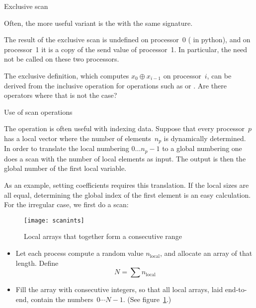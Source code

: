  {Exclusive scan}
\label{sec:mpi-exscan}

Often, the more useful variant is the 
%
%
with the same signature. 

The result of the exclusive scan is undefined on processor~0
( in python),
and on processor~1 it is a copy of the send value of processor~1.
In particular, the  need not be called on these two 
processors.

\begin{exercise}
  The exclusive definition, which computes $x_0\oplus x_{i-1}$ on
  processor~$i$, can be derived from the inclusive operation
  for operations such as  or
  .  Are there operators where that is not the
  case?
\end{exercise}

 {Use of scan operations}

The  operation is often useful with indexing data. Suppose that
every processor~$p$ has a local vector where the number of elements~$n_p$ is dynamically 
determined. In order to translate the local numbering $0\ldots n_p-1$ to a global numbering
one does a scan with the number of local elements as input. The output is then the global 
number of the first local variable.

As an example, setting  coefficients requires this translation.
If the local sizes are all equal, determining the global index of the
first element is an easy calculation.
For the irregular case, we first do a scan:
%

\begin{figure}[ht]
  \texttt{[image: scanints]}
  \caption{Local arrays that together form a consecutive range}
  \label{fig:scanints}
\end{figure}

\begin{exercise}
  \label{ex:scanprint}
  \begin{itemize}
  \item Let each process compute a random value $n_{\scriptstyle\mathrm{local}}$,
    and allocate an array of that length.
    Define \[ N=\sum n_{\scriptstyle\mathrm{local}} \]
  \item Fill the array with consecutive integers, so that all local arrays,
    laid end-to-end,
    contain the numbers~$0\cdots N-1$. (See figure~\ref{fig:scanints}.)
  \end{itemize}
\end{exercise}

